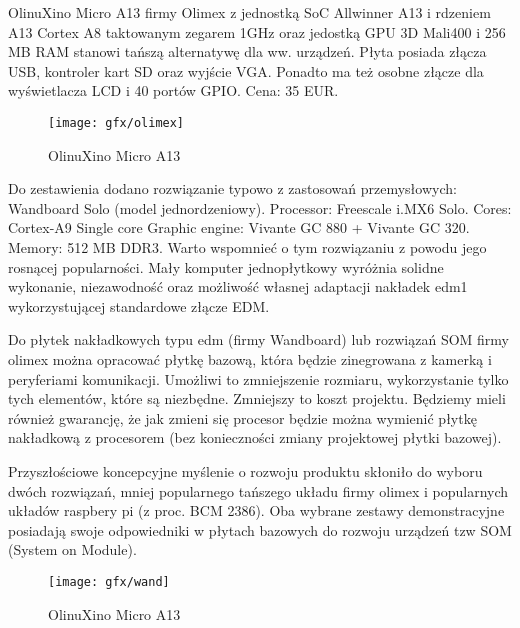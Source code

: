 OlinuXino Micro A13 firmy Olimex  z jednostką SoC Allwinner A13 i rdzeniem A13 Cortex A8 taktowanym zegarem 1GHz oraz jedostką GPU 3D Mali400 i 256 MB RAM stanowi tańszą alternatywę dla ww. urządzeń. Płyta posiada złącza USB, kontroler kart SD oraz wyjście VGA. Ponadto ma też osobne złącze dla wyświetlacza LCD i 40 portów GPIO. Cena: 35 EUR.

\begin{figure}[bth]
\centering
{\texttt{[image: gfx/olimex]}}
\caption[OlinuXino Micro A13]{OlinuXino Micro A13}
\label{fig:Chipscope}
\end{figure}

Do zestawienia dodano rozwiązanie typowo z zastosowań przemysłowych: Wandboard Solo (model jednordzeniowy). Processor: Freescale i.MX6 Solo. Cores: Cortex-A9 Single core 
Graphic engine: Vivante GC 880 + Vivante GC 320. Memory: 512 MB DDR3. Warto wspomnieć o tym rozwiązaniu z powodu jego rosnącej popularności. Mały komputer jednopłytkowy wyróżnia solidne wykonanie, niezawodność oraz możliwość własnej adaptacji nakładek edm1 wykorzystującej standardowe złącze EDM. 

Do płytek nakładkowych typu edm (firmy Wandboard) lub rozwiązań SOM firmy olimex można opracować płytkę bazową, która będzie zinegrowana z kamerką i peryferiami komunikacji. Umożliwi to zmniejszenie rozmiaru, wykorzystanie tylko tych elementów, które są niezbędne. Zmniejszy to koszt projektu. Będziemy mieli również gwarancję, że jak zmieni się procesor będzie można wymienić płytkę nakładkową z procesorem (bez konieczności zmiany projektowej płytki bazowej).

Przyszłościowe koncepcyjne myślenie o rozwoju produktu skłoniło do wyboru dwóch rozwiązań, mniej popularnego tańszego układu firmy olimex i popularnych układów raspbery pi (z proc. BCM 2386). Oba wybrane zestawy demonstracyjne posiadają swoje odpowiedniki w płytach bazowych do rozwoju urządzeń tzw SOM (System on Module).

\begin{figure}[bth]
\centering
{\texttt{[image: gfx/wand]}}
\caption[OlinuXino Micro A13]{OlinuXino Micro A13}
\label{fig:Chipscope}
\end{figure}


